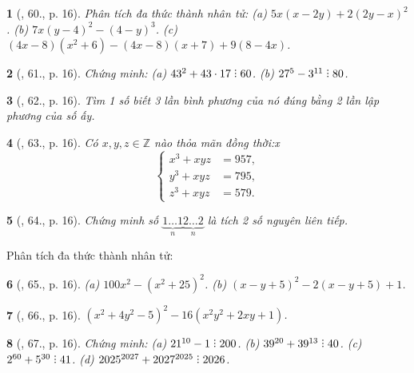 \documentclass{article}
\newtheorem{baitoan}{}
\DeclareRobustCommand{\divby}{%
	\mathrel{\vbox{\baselineskip.65ex\lineskiplimit0pt\hbox{.}\hbox{.}\hbox{.}}}%
}
\begin{document}
\begin{baitoan}[\cite{Tuyen_Toan_8}, 60., p. 16]
	Phân tích đa thức thành nhân tử: (a) $5x(x - 2y) + 2(2y - x)^2$. (b) $7x(y - 4)^2 - (4 - y)^3$. (c) $(4x - 8)(x^2 + 6) - (4x - 8)(x + 7) + 9(8 - 4x)$.
\end{baitoan}

\begin{baitoan}[\cite{Tuyen_Toan_8}, 61., p. 16]
	Chứng minh: (a) $43^2 + 43\cdot17\divby60$. (b) $27^5 - 3^{11}\divby80$.
\end{baitoan}

\begin{baitoan}[\cite{Tuyen_Toan_8}, 62., p. 16]
	Tìm 1 số biết 3 lần bình phương của nó đúng bằng 2 lần lập phương của số ấy.
\end{baitoan}

\begin{baitoan}[\cite{Tuyen_Toan_8}, 63., p. 16]
	Có $x,y,z\in\mathbb{Z}$ nào thỏa mãn đồng thời:x
	\begin{equation*}
		\left\{\begin{split}
			x^3 + xyz &= 957,\\
			y^3 + xyz &= 795,\\
			z^3 + xyz &= 579.
		\end{split}\right.
	\end{equation*}
\end{baitoan}

\begin{baitoan}[\cite{Tuyen_Toan_8}, 64., p. 16]
	Chứng minh số $\underbrace{1\ldots1}_n\underbrace{2\ldots2}_n$ là tích 2 số nguyên liên tiếp.
\end{baitoan}
Phân tích đa thức thành nhân tử:

\begin{baitoan}[\cite{Tuyen_Toan_8}, 65., p. 16]
    (a) $100x^2 - (x^2 + 25)^2$. (b) $(x - y + 5)^2 - 2(x - y + 5) + 1$.
\end{baitoan}

\begin{baitoan}[\cite{Tuyen_Toan_8}, 66., p. 16]
	$(x^2 + 4y^2 - 5)^2 - 16(x^2y^2 + 2xy + 1)$.
\end{baitoan}

\begin{baitoan}[\cite{Tuyen_Toan_8}, 67., p. 16]
	Chứng minh: (a) $21^{10} - 1\divby200$. (b) $39^{20} + 39^{13}\divby40$. (c) $2^{60} + 5^{30}\divby41$. (d) $2025^{2027} + 2027^{2025}\divby2026$.
\end{baitoan}
\end{document}
